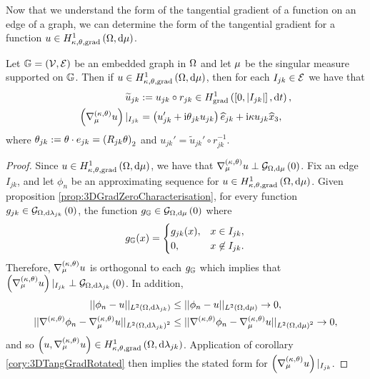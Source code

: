 Now that we understand the form of the tangential gradient of a function on an edge of a graph, we can determine the form of the tangential gradient for a function $u\in H^1_{\kappa,\theta,\mathrm{grad}}\left( \Omega, \mathrm{d}\mu \right)$.
\begin{cory} \label{cory:3DTangGradGraph}
	Let $\mathbb{G}=\left( \mathcal{V}, \mathcal{E} \right)$ be an embedded graph in $\Omega$ and let $\mu$ be the singular measure supported on $\mathbb{G}$.
	Then if $u\in H^1_{\kappa,\theta,\mathrm{grad}}\left( \Omega, \mathrm{d}\mu \right)$, then for each $I_{jk}\in\mathcal{E}$ we have that
	\begin{align*}
		\widetilde{u}_{jk} &:= u_{jk} \circ r_{jk} \in H^1_\mathrm{grad}\left( \left[ 0,\left\lvert I_{jk} \right\rvert \right], \mathrm{d}t \right), \\
		\left(  \nabla^{\left( \kappa, \theta \right)}_{\mu} u  \right)\vert_{I_{jk}} &= 
		\left(  u_{jk}' + \mathrm{i}\theta_{jk}u_{jk}  \right)\widehat{e}_{jk} + \mathrm{i}\kappa u_{jk}\widehat{x}_3,
	\end{align*}
	where $\theta_{jk} := \theta\cdot e_{jk} = \left(  R_{jk}\theta  \right)_2$ and $u_{jk}' = \widetilde{u}_{jk}' \circ r_{jk}^{-1}$.
\end{cory}
\begin{proof}
	Since $u\in H^1_{\kappa,\theta,\mathrm{grad}}\left( \Omega, \mathrm{d}\mu \right)$, we have that $\nabla^{\left( \kappa, \theta \right)}_{\mu} u \perp \mathcal{G}_{ \Omega, \mathrm{d}\mu}\left( 0 \right)$.
	Fix an edge $I_{jk}$, and let $\phi_n$ be an approximating sequence for $u\in H^1_{\kappa,\theta,\mathrm{grad}}\left( \Omega, \mathrm{d}\mu \right)$.
	Given proposition \ref{prop:3DGradZeroCharacterisation}, for every function $g_{jk}\in\mathcal{G}_{ \Omega, \mathrm{d}\lambda_{jk}}\left( 0 \right)$, the function $g_{\mathbb{G}}\in\mathcal{G}_{ \Omega, \mathrm{d}\mu}\left( 0 \right)$ where
	\begin{align*}
		g_{\mathbb{G}}(x) = 
		\begin{cases} 
			g_{jk}(x), & x\in I_{jk}, \\
			0, & x\not\in I_{jk}.
		\end{cases}
	\end{align*}
	Therefore, $\nabla^{\left( \kappa, \theta \right)}_{\mu} u$ is orthogonal to each $g_{\mathbb{G}}$ which implies that $\left(  \nabla^{\left( \kappa, \theta \right)}_{\mu} u  \right)\vert_{I_{jk}} \perp \mathcal{G}_{ \Omega, \mathrm{d}\lambda_{jk}}\left( 0 \right)$.
	In addition, 
	\begin{align*}
		\lvert\lvert \phi_n - u \rvert\rvert_{L^{2}\left( \Omega,\mathrm{d}\lambda_{jk} \right)} &\leq \lvert\lvert \phi_n - u \rvert\rvert_{L^{2}\left( \Omega,\mathrm{d}\mu \right)} \rightarrow 0, \\
		\lvert\lvert \nabla^{\left( \kappa, \theta \right)}\phi_n - \nabla^{\left( \kappa, \theta \right)}_{\mu} u \rvert\rvert_{L^{2}\left( \Omega,\mathrm{d}\lambda_{jk} \right)^2} &\leq \lvert\lvert \nabla^{\left( \kappa, \theta \right)}\phi_n - \nabla^{\left( \kappa, \theta \right)}_{\mu} u \rvert\rvert_{L^{2}\left( \Omega,\mathrm{d}\mu \right)^2} \rightarrow 0,
	\end{align*}
	and so $\left( u, \nabla^{\left( \kappa, \theta \right)}_{\mu} u \right)\in H^1_{\kappa,\theta,\mathrm{grad}}\left( \Omega, \mathrm{d}\lambda_{jk} \right)$.
	Application of corollary \ref{cory:3DTangGradRotated} then implies the stated form for $\left(  \nabla^{\left( \kappa, \theta \right)}_{\mu} u  \right)\vert_{I_{jk}}$.
\end{proof}


